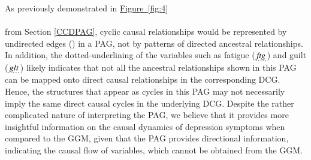\documentclass[twoside, 11pt]{article}
\newcommand{\udot}[1]{%
    \tikz[baseline=(todotted.base)]{
        \node[inner sep=1pt,outer sep=0pt] (todotted) {#1};
        \draw[dotted, thick] (todotted.south west) -- (todotted.south east);
    }%
}%
\newcommand{\tailarrow}{%
\begin{tikzpicture}
    \draw [-{Straight Barb[length=2.5pt]}](0,0) -- (0.4, 0);
\end{tikzpicture}
}
\newcommand*{\figref}[2][]{%
  \hyperref[{fig:#2}]{%
    Figure~\ref*{fig:#2}%
    \ifx\\#1\\%
    \else
      #1%
    \fi
  }%
}
\begin{document}
As previously demonstrated in \figref[]{4} from Section \ref{CCDPAG}, cyclic causal relationships would be represented by undirected edges (\textemdash) in a PAG, not by patterns of directed ancestral relationships. In addition, the dotted-underlining of the variables such as fatigue ($\udot{\textit{ftg}}$) and guilt ($\udot{\textit{glt}}$) likely indicates that not all the ancestral relationships shown in this PAG can be mapped onto direct causal relationships in the corresponding DCG. Hence, the structures that appear as cycles in this PAG may not necessarily imply the same direct causal cycles in the underlying DCG. 
Despite the rather complicated nature of interpreting the PAG, we believe that it provides more insightful information on the causal dynamics of depression symptoms when compared to the GGM, given that the PAG provides directional information, indicating the causal flow of variables, which cannot be obtained from the GGM. 





\end{document}
